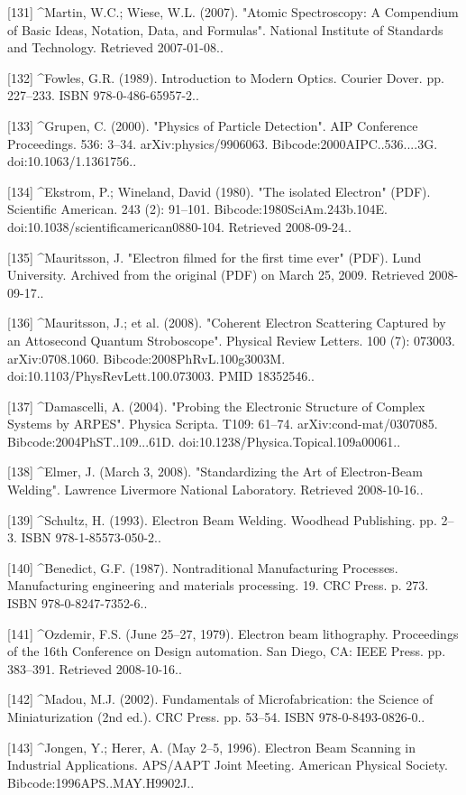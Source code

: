 [131]
^Martin, W.C.; Wiese, W.L. (2007). "Atomic Spectroscopy: A Compendium of Basic Ideas, Notation, Data, and Formulas". National Institute of Standards and Technology. Retrieved 2007-01-08..

[132]
^Fowles, G.R. (1989). Introduction to Modern Optics. Courier Dover. pp. 227–233. ISBN 978-0-486-65957-2..

[133]
^Grupen, C. (2000). "Physics of Particle Detection". AIP Conference Proceedings. 536: 3–34. arXiv:physics/9906063. Bibcode:2000AIPC..536....3G. doi:10.1063/1.1361756..

[134]
^Ekstrom, P.; Wineland, David (1980). "The isolated Electron" (PDF). Scientific American. 243 (2): 91–101. Bibcode:1980SciAm.243b.104E. doi:10.1038/scientificamerican0880-104. Retrieved 2008-09-24..

[135]
^Mauritsson, J. "Electron filmed for the first time ever" (PDF). Lund University. Archived from the original (PDF) on March 25, 2009. Retrieved 2008-09-17..

[136]
^Mauritsson, J.; et al. (2008). "Coherent Electron Scattering Captured by an Attosecond Quantum Stroboscope". Physical Review Letters. 100 (7): 073003. arXiv:0708.1060. Bibcode:2008PhRvL.100g3003M. doi:10.1103/PhysRevLett.100.073003. PMID 18352546..

[137]
^Damascelli, A. (2004). "Probing the Electronic Structure of Complex Systems by ARPES". Physica Scripta. T109: 61–74. arXiv:cond-mat/0307085. Bibcode:2004PhST..109...61D. doi:10.1238/Physica.Topical.109a00061..

[138]
^Elmer, J. (March 3, 2008). "Standardizing the Art of Electron-Beam Welding". Lawrence Livermore National Laboratory. Retrieved 2008-10-16..

[139]
^Schultz, H. (1993). Electron Beam Welding. Woodhead Publishing. pp. 2–3. ISBN 978-1-85573-050-2..

[140]
^Benedict, G.F. (1987). Nontraditional Manufacturing Processes. Manufacturing engineering and materials processing. 19. CRC Press. p. 273. ISBN 978-0-8247-7352-6..

[141]
^Ozdemir, F.S. (June 25–27, 1979). Electron beam lithography. Proceedings of the 16th Conference on Design automation. San Diego, CA: IEEE Press. pp. 383–391. Retrieved 2008-10-16..

[142]
^Madou, M.J. (2002). Fundamentals of Microfabrication: the Science of Miniaturization (2nd ed.). CRC Press. pp. 53–54. ISBN 978-0-8493-0826-0..

[143]
^Jongen, Y.; Herer, A. (May 2–5, 1996). Electron Beam Scanning in Industrial Applications. APS/AAPT Joint Meeting. American Physical Society. 
Bibcode:1996APS..MAY.H9902J..

